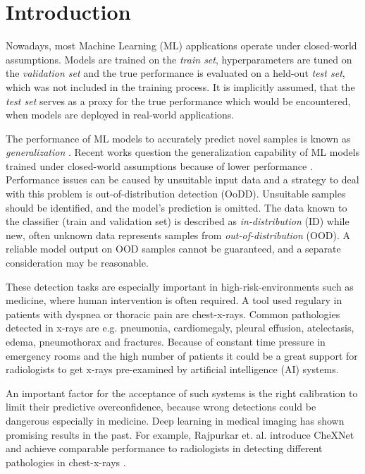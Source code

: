 \section{Introduction}
\raggedbottom
Nowadays, most Machine Learning (ML) applications operate under closed-world assumptions.
Models are trained on the \textit{train set}, hyperparameters are tuned on the \textit{validation set} and the true performance is evaluated on a held-out \textit{test set}, which was not included in the training process.
It is implicitly assumed, that the \textit{test set} serves as a proxy for the true performance which would be encountered, when models are deployed in real-world applications.
\par
The performance of ML models to accurately predict novel samples is known as \textit{generalization} \citep{Bishop2006}.
Recent works question the generalization capability of ML models trained under closed-world assumptions because of lower performance \citep{Recht2018,Zech2018}.
Performance issues can be caused by unsuitable input data and a strategy to deal with this problem is out-of-distribution detection (OoDD).
Unsuitable samples should be identified, and the model's prediction is omitted.
The data known to the classifier (train and validation set) is described as \textit{in-distribution} (ID) while new, often unknown data represents samples from \textit{out-of-distribution} (OOD).
A reliable model output on OOD samples cannot be guaranteed, and a separate consideration may be reasonable.
\par
These detection tasks are especially important in high-risk-environments such as medicine, where human intervention is often required. 
A tool used regulary in patients with dyspnea or thoracic pain are chest-x-rays.
Common pathologies detected in x-rays are e.g. pneumonia, cardiomegaly, pleural effusion, atelectasis, edema, pneumothorax and fractures. 
Because of constant time pressure in emergency rooms and the high number of patients it could be a great support for radiologists to get x-rays pre-examined by artificial intelligence (AI) systems.
\par
An important factor for the acceptance of such systems is the right calibration to limit their predictive overconfidence, because wrong detections could be dangerous especially in medicine.
Deep learning in medical imaging has shown promising results in the past. 
For example, Rajpurkar et. al. introduce CheXNet and achieve comparable performance to radiologists in detecting different pathologies in chest-x-rays \citep{Rajpurkar2017}.
